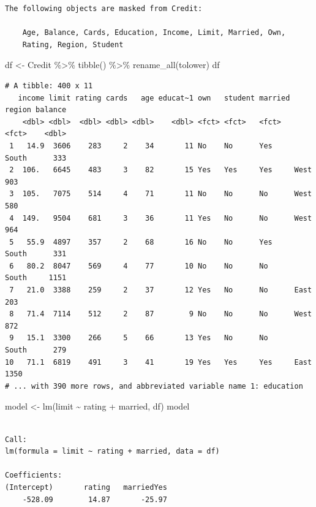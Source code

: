 \documentclass[
  letterpaper,
  DIV=11,
  numbers=noendperiod]{scrartcl}
\newenvironment{Shaded}{\begin{snugshade}}{\end{snugshade}}
\newcommand{\FunctionTok}[1]{\textcolor[rgb]{0.28,0.35,0.67}{#1}}
\newcommand{\NormalTok}[1]{\textcolor[rgb]{0.00,0.23,0.31}{#1}}
\newcommand{\OtherTok}[1]{\textcolor[rgb]{0.00,0.23,0.31}{#1}}
\newcommand{\SpecialCharTok}[1]{\textcolor[rgb]{0.37,0.37,0.37}{#1}}
\begin{document}
\begin{verbatim}
The following objects are masked from Credit:

    Age, Balance, Cards, Education, Income, Limit, Married, Own,
    Rating, Region, Student
\end{verbatim}

\begin{Shaded}
\begin{Highlighting}[]
\NormalTok{df }\OtherTok{\textless{}{-}}\NormalTok{ Credit }\SpecialCharTok{\%\textgreater{}\%} \FunctionTok{tibble}\NormalTok{() }\SpecialCharTok{\%\textgreater{}\%} \FunctionTok{rename\_all}\NormalTok{(tolower)}
\NormalTok{df}
\end{Highlighting}
\end{Shaded}

\begin{verbatim}
# A tibble: 400 x 11
   income limit rating cards   age educat~1 own   student married region balance
    <dbl> <dbl>  <dbl> <dbl> <dbl>    <dbl> <fct> <fct>   <fct>   <fct>    <dbl>
 1   14.9  3606    283     2    34       11 No    No      Yes     South      333
 2  106.   6645    483     3    82       15 Yes   Yes     Yes     West       903
 3  105.   7075    514     4    71       11 No    No      No      West       580
 4  149.   9504    681     3    36       11 Yes   No      No      West       964
 5   55.9  4897    357     2    68       16 No    No      Yes     South      331
 6   80.2  8047    569     4    77       10 No    No      No      South     1151
 7   21.0  3388    259     2    37       12 Yes   No      No      East       203
 8   71.4  7114    512     2    87        9 No    No      No      West       872
 9   15.1  3300    266     5    66       13 Yes   No      No      South      279
10   71.1  6819    491     3    41       19 Yes   Yes     Yes     East      1350
# ... with 390 more rows, and abbreviated variable name 1: education
\end{verbatim}

\begin{Shaded}
\begin{Highlighting}[]
\NormalTok{model }\OtherTok{\textless{}{-}} \FunctionTok{lm}\NormalTok{(limit }\SpecialCharTok{\textasciitilde{}}\NormalTok{ rating }\SpecialCharTok{+}\NormalTok{ married, df)}
\NormalTok{model}
\end{Highlighting}
\end{Shaded}

\begin{verbatim}

Call:
lm(formula = limit ~ rating + married, data = df)

Coefficients:
(Intercept)       rating   marriedYes  
    -528.09        14.87       -25.97  
\end{verbatim}
\end{document}
